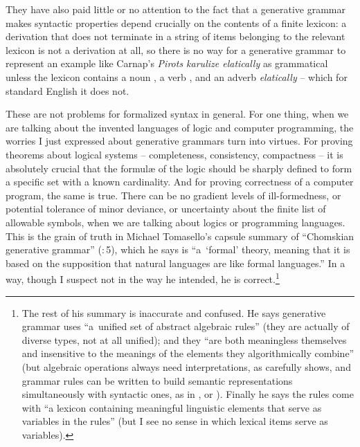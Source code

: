 \documentclass[output=paper]{langscibook}
\begin{document}
They have also paid little or no attention to the fact that a generative grammar makes syntactic properties depend crucially on the contents of a finite lexicon: a derivation that does not terminate in a string of items belonging to the relevant lexicon is not a derivation at all, so there is no way for a generative grammar to represent an example like Carnap's \textit{Pirots karulize elatically} as grammatical unless the lexicon contains a noun , a verb , and an adverb \textit{elatically} -- which for standard English it does not.

These are not problems for formalized syntax in general. For one thing, when we are talking about the invented languages of logic and computer programming, the worries I just expressed about generative grammars turn into virtues. For proving theorems about logical systems -- completeness, consistency, compactness -- it is absolutely crucial that the formul{\ae} of the logic should be sharply defined to form a specific set with a known cardinality. And for proving correctness of a computer program, the same is true. There can be no gradient levels of ill-formedness, or potential tolerance of minor deviance, or uncertainty about the finite list of allowable symbols, when we are talking about logics or programming languages.  This is the grain of truth in Michael Tomasello's capsule summary of ``Chomskian generative grammar'' (\citeyear{Tomasello03}:\,5), which he says is ``a~`formal' theory, meaning that it is based on the supposition that natural languages are like formal languages.'' In a way, though I suspect not in the way he intended, he is correct.\footnote{The rest of his summary is inaccurate and confused. He says generative grammar uses ``a~unified set of abstract algebraic rules'' (they are actually of diverse types, not at all unified); and they ``are both meaningless themselves and insensitive to the meanings of the elements they algorithmically combine'' (but algebraic operations always need interpretations, as \citealt{McCawley68BASE} carefully shows, and grammar rules can be written to build semantic representations simultaneously with syntactic ones, as in \citealt{Montague73PTQ},      \citealt{Montague74} or \citealt{GaKlPuSa85}). Finally he says the rules come with ``a lexicon containing meaningful linguistic elements that      serve as variables in the rules'' (but I see no sense in which lexical items serve as variables).}
\end{document}
